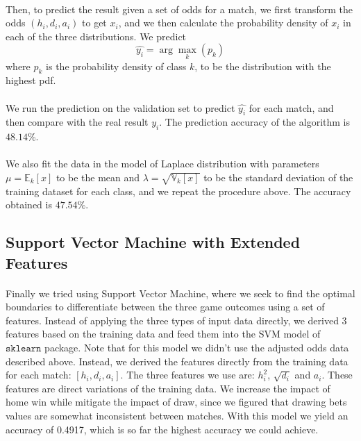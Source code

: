 \documentclass[12pt]{article}
\begin{document}
\paragraph{}
Then, to predict the result given a set of odds for a match, we first transform the odds $(h_i, d_i, a_i)$ to get $x_i$, and we then calculate the probability density of $x_i$ in each of the three distributions. We predict \[
\hat{y_i} = \arg\max_k(p_k)
\] where $p_k$ is the probability density of class $k$, to be the distribution with the highest pdf.
\paragraph{}
We run the prediction on the validation set to predict $\hat{y_i}$ for each match, and then compare with the real result $y_i$. The prediction accuracy of the algorithm is $48.14 \%$.
\paragraph{}
We also fit the data in the model of Laplace distribution with parameters $\mu = 
\mathbb{E}_k[x]$ to be the mean and $\lambda = \sqrt{\mathbb{V}_k[x]}$ to be the standard deviation of the training dataset for each class, and we repeat the procedure above. The accuracy obtained is $47.54\%$.
\subsection{Support Vector Machine with Extended Features}

\paragraph{}
Finally we tried using Support Vector Machine, where we seek to find the optimal boundaries to differentiate between the three game outcomes using a set of features. Instead of applying the three types of input data directly, we derived 3 features based on the training data and feed them into the SVM model of $\texttt{sklearn}$ package. Note that for this model we didn't use the adjusted odds data described above. Instead, we derived the features directly from the training data for each match: $[h_i, d_i, a_i]$. The three features we use are: $h_i^2$, $\sqrt{d_i}$ and $a_i$. These features are direct variations of the training data. We increase the impact of home win while mitigate the impact of draw, since we figured that drawing bets values are somewhat inconsistent between matches. With this model we yield an accuracy of 0.4917, which is so far the highest accuracy we could achieve.
\end{document}
